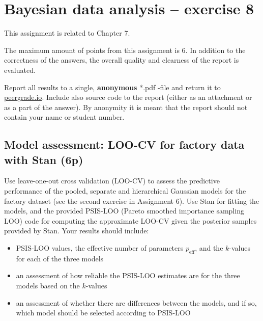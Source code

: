 \documentclass[a4paper,11pt]{article}
\begin{document}
\thispagestyle{empty}

\section*{Bayesian data analysis -- exercise 8}

This assignment is related to Chapter 7.

The maximum amount of points from this assignment is 6. In addition to the correctness of the answers, the overall quality and clearness of the report is evaluated.

Report all results to a single, {\bf anonymous} *.pdf -file and return it to \href{peergrade.io}{peergrade.io}. Include also source code to the report (either as an attachment or as a part of the answer). By anonymity it is meant that the report should not contain your name or student number.

\vspace{1cm}







\subsection*{Model assessment: LOO-CV for factory data with Stan (6p)}

Use leave-one-out cross validation (LOO-CV) to assess the predictive performance of the pooled, separate and hierarchical Gaussian models for the factory dataset (see the second exercise in Assignment 6).
Use Stan for fitting the models, and the provided PSIS-LOO (Pareto smoothed importance sampling LOO) code for computing the approximate LOO-CV given the posterior samples provided by Stan. Your results should include:
\begin{itemize}
	\item PSIS-LOO values, the effective number of parameters $p_\text{eff}$, and the $k$-values for each of the three models
	\item an assessment of how reliable the PSIS-LOO estimates are for the three models based on the $k$-values
	\item an assessment of whether there are differences between the models, and if so, which model should be selected according to PSIS-LOO
\end{itemize}
\end{document}

